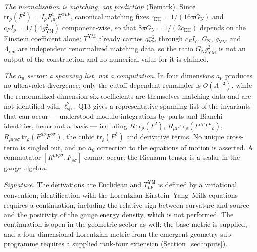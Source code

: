\documentclass[11pt,a4paper]{article}
\theoremstyle{definition}
\newcommand{\GN}{G_{\mathrm{N}}}
\newcommand{\gYM}{g_{\mathrm{YM}}}
\newcommand{\cEH}{c_{\mathrm{EH}}}
\newcommand{\cF}{c_{F}}
\newcommand{\Irho}{I_\rho}
\newcommand{\lsp}{\ell_{\mathrm{sp}}}
\begin{document}
      \textit{The normalisation is matching, not prediction} (Remark).
      Since $\mathrm{tr}_\rho(F^2) = \Irho F^a_{\mu\nu}F^{a\,\mu\nu}$, canonical matching fixes
      $\cEH = 1/(16\pi\GN)$ and $\cF\Irho = 1/(4\gYM^2)$ component-wise, so that
      $8\pi\GN = 1/(2\cEH)$ depends on the Einstein coefficient alone; $T^{\mathrm{YM}}$ already
      carries $\gYM^{-2}$ through $\cF\Irho$.
      $\GN$, $\gYM$ and $\Lambda_{\mathrm{ren}}$ are independent renormalized matching data, so
      the ratio $\GN\gYM^2$ is not an output of the construction and no numerical value for it is
      claimed.

      \textit{The $a_6$ sector: a spanning list, not a computation.}
      In four dimensions $a_6$ produces no ultraviolet divergence; only the cutoff-dependent
      remainder is $O(\Lambda^{-2})$, while the renormalized dimension-six coefficients are
      themselves matching data and are not identified with $\lsp^2$.
      Q13 gives a representative spanning list of the invariants that can occur --- understood
      modulo integrations by parts and Bianchi identities, hence not a basis --- including
      $R\,\mathrm{tr}_\rho(F^2)$, $R_{\mu\nu}\,\mathrm{tr}_\rho(F^{\mu\rho}F^\nu{}_\rho)$,
      $R_{\mu\nu\rho\sigma}\,\mathrm{tr}_\rho(F^{\mu\nu}F^{\rho\sigma})$, the cubic
      $\mathrm{tr}_\rho(F^3)$ and derivative terms.
      No unique cross-term is singled out, and no $a_6$ correction to the equations of motion is
      asserted.
      A commutator $[R^{\mu\nu\rho\sigma},F_{\rho\sigma}]$ cannot occur: the Riemann tensor is a
      scalar in the gauge algebra.

      \textit{Signature.}
      The derivations are Euclidean and $T^{\mathrm{YM}}_{\mu\nu}$ is defined by a variational
      convention; identification with the Lorentzian Einstein--Yang--Mills equations requires a
      continuation, including the relative sign between curvature and source and the positivity of
      the gauge energy density, which is not performed.
      The continuation is open in the geometric sector as well: the base metric is supplied, and a
      four-dimensional Lorentzian metric from the emergent geometry sub-programme requires a supplied rank-four
      extension (Section~\ref{sec:inputs}).
\end{document}
